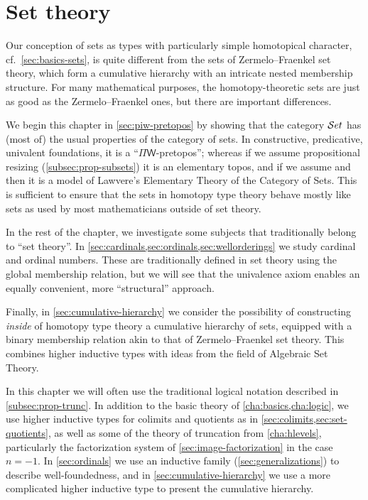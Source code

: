\chapter{Set theory}
\label{cha:set-math}

Our conception of sets as types with particularly simple homotopical character, cf.\
\autoref{sec:basics-sets}, is quite different from the sets of Zermelo--Fraenkel set theory, which form a
cumulative hierarchy with an intricate nested membership structure.
For many mathematical purposes, the homotopy-the\-o\-ret\-ic sets are just as good as
the Zermelo--Fraenkel ones, but there are important differences.

We begin this chapter in \autoref{sec:piw-pretopos} by showing that the category $\mathcal{S}et$ has (most of) the usual properties of the category of sets.
In constructive, predicative, univalent foundations, it is a ``$\Pi\mathsf{W}$-pretopos''; whereas if we assume propositional resizing (\autoref{subsec:prop-subsets}) it is an elementary topos, and if we assume \LEM{} and \choice{} then it is a model of Lawvere's Elementary Theory of the Category of Sets.
This is sufficient to ensure that the sets in homotopy type theory behave mostly like sets as used by most mathematicians outside of set theory.

In the rest of the chapter, we investigate some subjects that traditionally belong to ``set theory''.
In \autoref{sec:cardinals,sec:ordinals,sec:wellorderings} we study cardinal and ordinal numbers.
These are traditionally defined in set theory using the global membership relation, but we will see that the univalence axiom enables an equally convenient, more ``structural'' approach.

Finally, in \autoref{sec:cumulative-hierarchy} we consider the possibility of constructing \emph{inside} of homotopy type theory a cumulative hierarchy of sets, equipped with a binary membership relation akin to that of Zermelo--Fraenkel set theory.
This combines higher inductive types with ideas from the field of Algebraic Set Theory.

In this chapter we will often use the traditional logical notation described in \autoref{subsec:prop-trunc}.
In addition to the basic theory of \autoref{cha:basics,cha:logic}, we use higher inductive types for colimits and quotients as in \autoref{sec:colimits,sec:set-quotients}, as well as some of the theory of truncation from \autoref{cha:hlevels}, particularly the factorization system of \autoref{sec:image-factorization} in the case $n=-1$.
In \autoref{sec:ordinals} we use an inductive family (\autoref{sec:generalizations}) to describe well-foundedness, and in \autoref{sec:cumulative-hierarchy} we use a more complicated higher inductive type to present the cumulative hierarchy.


